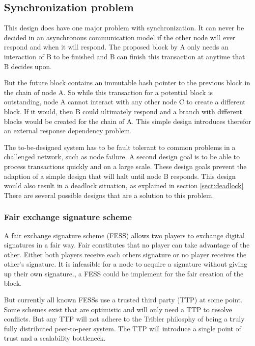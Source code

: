 \subsection{Synchronization problem}
This design does have one major problem with synchronization.
It can never be decided in an asynchronous communication model
if the other node will ever respond and when it will respond.
The proposed block by A only needs an interaction of B to be finished
and B can finish this transaction at anytime that B decides upon.

But the future block contains an immutable hash pointer
to the previous block in the chain of node A.
So while this transaction for a potential block is outstanding,
node A cannot interact with any other node C to create a different block.
If it would, then B could ultimately respond and a branch with different blocks
would be created for the chain of A.
This simple design introduces therefor an external response dependency problem.

The to-be-designed system has to be fault tolerant to
common problems in a challenged network, such as node failure.
A second design goal is to be able to process transactions quickly and on a large scale.
These design goals prevent the adaption of a simple design that will halt until node B responds.
This design would also result in a deadlock situation, as explained in section \ref{sect:deadlock}
There are several possible designs that are a solution to this problem.

\subsubsection{Fair exchange signature scheme}
A fair exchange signature scheme (FESS) allows two players to exchange digital signatures in a fair way.
Fair constitutes that no player can take advantage of the other.
Either both players receive each others signature or no player receives the other's signature.
It is infeasible for a node to acquire a signature without giving up their own signature.\cite{asokan-fairexchange},
a FESS could be implement for the fair creation of the block.

But currently all known FESSs use a trusted third party (TTP) at some point\cite{asokan-fairexchange}.
Some schemes exist that are optimistic and will only need a TTP to resolve conflicts.
But any TTP will not adhere to the Tribler philosphy
of being a truly fully distributed peer-to-peer system.
The TTP will introduce a single point of trust and a scalability bottleneck.

